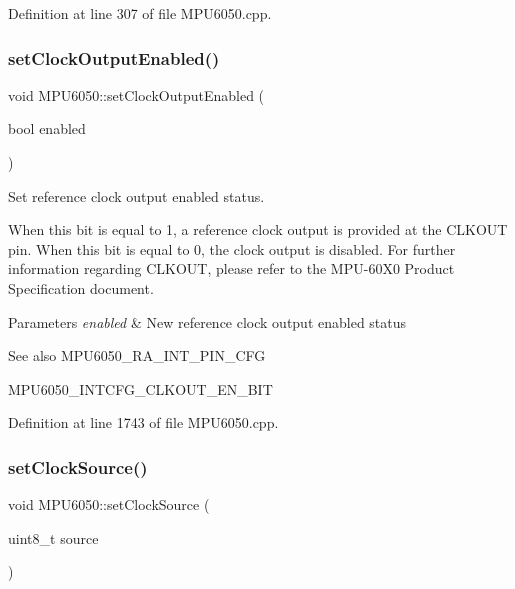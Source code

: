 Definition at line 307 of file M\+P\+U6050.\+cpp.

\mbox{\label{classMPU6050_a71ec4642b6f6c937bbf6a24fea4179e5}} 
\subsubsection{\texorpdfstring{setClockOutputEnabled()}{setClockOutputEnabled()}}
{\footnotesize\ttfamily void M\+P\+U6050\+::set\+Clock\+Output\+Enabled (\begin{DoxyParamCaption}\item[{bool}]{enabled }\end{DoxyParamCaption})}



Set reference clock output enabled status. 

When this bit is equal to 1, a reference clock output is provided at the C\+L\+K\+O\+UT pin. When this bit is equal to 0, the clock output is disabled. For further information regarding C\+L\+K\+O\+UT, please refer to the M\+P\+U-\/60\+X0 Product Specification document. 
\begin{DoxyParams}{Parameters}
{\em enabled} & New reference clock output enabled status \\
\hline
\end{DoxyParams}
\begin{DoxySeeAlso}{See also}
M\+P\+U6050\+\_\+\+R\+A\+\_\+\+I\+N\+T\+\_\+\+P\+I\+N\+\_\+\+C\+FG 

M\+P\+U6050\+\_\+\+I\+N\+T\+C\+F\+G\+\_\+\+C\+L\+K\+O\+U\+T\+\_\+\+E\+N\+\_\+\+B\+IT 
\end{DoxySeeAlso}


Definition at line 1743 of file M\+P\+U6050.\+cpp.

\mbox{\label{classMPU6050_a4c1cd147d038e024bdeaa053c4d77734}} 
\subsubsection{\texorpdfstring{setClockSource()}{setClockSource()}}
{\footnotesize\ttfamily void M\+P\+U6050\+::set\+Clock\+Source (\begin{DoxyParamCaption}\item[{uint8\+\_\+t}]{source }\end{DoxyParamCaption})}



